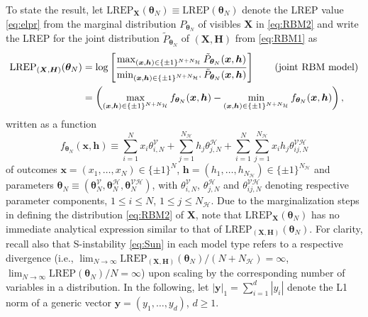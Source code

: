 \documentclass[numbib]{imamat}
\theoremstyle{theorem}
\theoremstyle{lemma}
\theoremstyle{example}
\theoremstyle{corollary}
\theoremstyle{definition}
\theoremstyle{remark}
\theoremstyle{approximation}
\theoremstyle{scheme}
\newcommand{\REP}{\mathrm{LREP}}
\begin{document}
To state the result, let \(\REP_{\boldsymbol X}(\boldsymbol \theta_N) \equiv \REP(\boldsymbol \theta_N)\) denote the LREP value \eqref{eq:elpr} from the marginal distribution \(P_{\boldsymbol \theta_N}\) of visibles \(\boldsymbol X\) in \eqref{eq:RBM2} and write the LREP for the joint distribution \(\tilde{P}_{\boldsymbol \theta_N}\) of \((\boldsymbol X, \boldsymbol H)\) from \eqref{eq:RBM1} as
\begin{align*}
\REP_{(\boldsymbol X, \boldsymbol H)}(\boldsymbol \theta_N) &=\log\left[  \frac{\max_{ (\boldsymbol x, \boldsymbol h) \in \{\pm 1\}^{N+N_{\mathcal{H}}}}
\tilde{P}_{\boldsymbol \theta_N} (\boldsymbol x, \boldsymbol h)}{\min_{ (\boldsymbol x, \boldsymbol h) \in \{\pm 1\}^{N+N_{\mathcal{H}}}`}
\tilde{P}_{\boldsymbol \theta_N} (\boldsymbol x, \boldsymbol h)} \right] \qquad \text{(joint RBM model)}    \\    
&= \left(\max_{ (\boldsymbol x, \boldsymbol h) \in \{\pm 1\}^{N+N_{\mathcal{H}}}} f_{\boldsymbol \theta_N} (\boldsymbol x, \boldsymbol h)-\min_{ (\boldsymbol x, \boldsymbol h) \in \{\pm 1\}^{N+N_{\mathcal{H}}}} f_{\boldsymbol \theta_N} (\boldsymbol x, \boldsymbol h)\right),
\end{align*}
written as a function
\begin{equation}
\label{eq:f}
f_{\boldsymbol \theta_N} (\boldsymbol x, \boldsymbol h)  \equiv  \sum_{i=1}^N x_i  \theta_{i,N}^{\mathcal{V}} +  \sum_{j=1}^{N_\mathcal{H}} h_j \theta_{j,N}^{\mathcal{H}} + \sum_{i=1}^N \sum_{j=1}^{N_\mathcal{H}} x_i h_j  \theta_{ij,N}^{\mathcal{VH}}  
\end{equation}
of outcomes \(\boldsymbol x =(x_1,\ldots,x_N) \in\{\pm1\}^{N}\), \(\boldsymbol h =(h_1,\ldots,h_{N_{\mathcal{H}}}) \in\{\pm1\}^{N_{\mathcal{H}}}\) and parameters \(\boldsymbol \theta_N \equiv (\boldsymbol \theta_N^{\mathcal{V}},\boldsymbol \theta_N^{\mathcal{H}}, \boldsymbol \theta_N^{\mathcal{VH}})\), with \(\theta_{i,N}^{\mathcal{V}}\), \(\theta_{j,N}^{\mathcal{H}}\) and \(\theta_{ij,N}^{\mathcal{VH}}\) denoting respective parameter components, \(1 \leq i \leq N\), \(1 \leq j \leq N_{\mathcal{H}}\). Due to the marginalization steps in defining the distribution \eqref{eq:RBM2} of \(\boldsymbol X\), note that \(\REP_{\boldsymbol X}(\boldsymbol \theta_N)\) has no immediate analytical expression similar to that of \(\REP_{(\boldsymbol X, \boldsymbol H)}(\boldsymbol \theta_N)\). For clarity, recall also that S-instability \eqref{eq:Sun} in each model type refers to a respective divergence (i.e., \(\lim_{N\to \infty} \REP_{(\boldsymbol X, \boldsymbol H)}(\boldsymbol \theta_N) /(N+N_{\mathcal{H}})=\infty\), \(\lim_{N\to \infty} \REP(\boldsymbol \theta_N) /N=\infty\)) upon scaling by the corresponding number of variables in a distribution. In the following, let \(|\boldsymbol y|_1 = \sum_{i=1}^d |y_i|\) denote the L1 norm of a generic vector \(\boldsymbol y =(y_1,\ldots,y_d)\), \(d \geq 1\).
\end{document}
